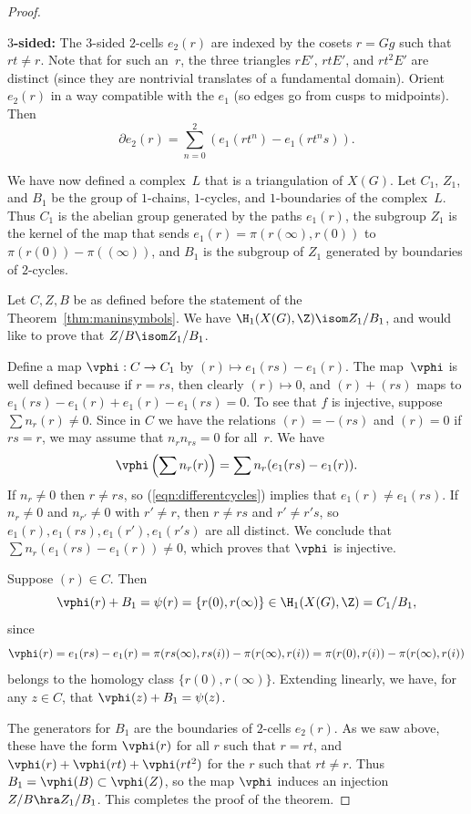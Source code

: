 \documentclass{report}
\begin{document}
\begin{proof}
\begin{itemize}
%
{\bf $3$-sided:} The $3$-sided $2$-cells $e_2(r)$ are indexed by
the cosets $r=Gg$ such that $rt\neq r$.    Note that for such
an~$r$, the three triangles $rE'$, $rtE'$, and $rt^2E'$ are
distinct (since they are nontrivial translates of a fundamental
domain).  Orient $e_2(r)$ in a way compatible with the $e_1$ (so
edges go from cusps to midpoints).  Then
\[
\partial e_2(r) = \sum_{n=0}^2 \left( e_1(rt^n) - e_1(rt^ns)
\right).
\]

%
\end{itemize}

We have now defined a complex~$L$ that is a triangulation of
$X(G)$. Let $C_1$, $Z_1$, and $B_1$ be the group of $1$-chains,
$1$-cycles, and $1$-boundaries of the complex~$L$.  Thus $C_1$ is
the abelian group generated by the paths $e_1(r)$, the subgroup
$Z_1$ is the kernel of the map that sends
$e_1(r)=\pi(r(\infty),r(0))$ to $\pi(r(0))-\pi((\infty))$, and
$B_1$ is the subgroup of $Z_1$ generated by boundaries of
$2$-cycles.

Let $C, Z, B$ be as defined before the statement of the
Theorem~\ref{thm:maninsymbols}.   We have $\H_1(X(G),\Z) \isom
Z_1/B_1$, and would like to prove that $Z/B \isom Z_1/B_1$.

Define a map $\vphi:C\to C_1$ by $(r)\mapsto e_1(rs) - e_1(r)$.
The map~$\vphi$ is well defined because if $r=rs$, then clearly
$(r)\mapsto 0$, and $(r)+(rs)$ maps to $e_1(rs)-e_1(r) + e_1(r) -
e_1(rs)=0$. To see that $f$ is injective, suppose $\sum n_r
(r)\neq 0$. Since in $C$ we have the relations $(r)=-(rs)$ and
$(r)=0$ if $rs=r$, we may assume that $n_r n_{rs}=0$ for all~$r$.
We have
\[
  \vphi\left(\sum n_r (r)\right) = \sum n_r(e_1(rs) - e_1(r)).
\]
If $n_r\neq 0$ then $r\neq rs$, so (\ref{eqn:differentcycles})
implies that $e_1(r)\neq e_1(rs)$. If $n_r\neq 0$ and $n_{r'}\neq
0$ with $r'\neq r$, then $r\neq rs$ and $r'\neq r's$, so $e_1(r),
e_1(rs), e_1(r'), e_1(r's)$ are all distinct.  We conclude that
$\sum n_r(e_1(rs) - e_1(r))\neq 0$, which proves that $\vphi$ is
injective.

Suppose $(r)\in C$. Then $$\vphi(r) + B_1 = \psi(r) =
\{r(0),r(\infty)\} \in \H_1(X(G),\Z)=C_1/B_1,$$ since $$\vphi(r) =
e_1(rs) - e_1(r) = \pi(rs(\infty),rs(i)) - \pi(r(\infty),r(i)) =
\pi(r(0),r(i)) - \pi(r(\infty),r(i))$$ belongs to the homology
class $\{r(0),r(\infty)\}$.   Extending linearly, we have, for any
$z\in C$, that $\vphi(z) + B_1 = \psi(z)$.

The generators for $B_1$ are the boundaries of $2$-cells $e_2(r)$.
 As we saw above, these have the form $\vphi(r)$ for all $r$ such that
 $r=rt$, and $\vphi(r)+\vphi(rt)+\vphi(rt^2)$ for the $r$ such that $rt\neq r$.
Thus $B_1 = \vphi(B)\subset \vphi(Z)$, so the map $\vphi$ induces
an injection $Z/B \hra Z_1/B_1$.   This completes the proof of the
theorem.

\end{proof}
\end{document}
